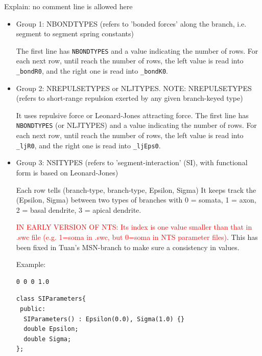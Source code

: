 Explain: no comment line is allowed here
\begin{itemize}
  \item Group 1: NBONDTYPES (refers to 'bonded forces' along the branch, i.e.
  segment to segment spring constants)
  
  The first line has \verb!NBONDTYPES! and a value indicating the number of
  rows. For each next row, until reach the number of rows, the left value is
  read into \verb!_bondR0!, and the right one is read into \verb!_bondK0!.

  \item Group 2: NREPULSETYPES or NLJTYPES. 
  NOTE: NREPULSETYPES (refers to short-range repulsion exerted by any given
  branch-keyed type)
  
  It uses repulsive force or Leonard-Jones attracting force.
  The first line has \verb!NBONDTYPES! (or NLJTYPES) and a value indicating the
  number of rows. For each next row, until reach the number of rows, the left value is
  read into \verb!_ljR0!, and the right one is read into \verb!_ljEps0!.
  
  \item Group 3: NSITYPES (refers to 'segment-interaction' (SI), with functional
  form is based on Leonard-Jones)
  
  Each row tells (branch-type, branch-type, Epsilon, Sigma)
  It keeps track the (Epsilon, Sigma) between two types of branches
  with 0 = somata, 1 = axon, 2 = basal dendrite, 3 = apical dendrite.
  
\begin{mdframed}
\textcolor{red}{IN EARLY VERSION OF NTS: Its index is one value smaller than
that in .swc file (e.g. 1=soma in .swc, but 0=soma in NTS parameter files)}.
This has been fixed in Tuan's MSN-branch to make sure a consistency in values.
\end{mdframed}

Example:
\begin{verbatim}
0 0 0 1.0
\end{verbatim}


\begin{lstlisting}
class SIParameters{
 public:
  SIParameters() : Epsilon(0.0), Sigma(1.0) {}
  double Epsilon;
  double Sigma;
};
\end{lstlisting}

\end{itemize}


